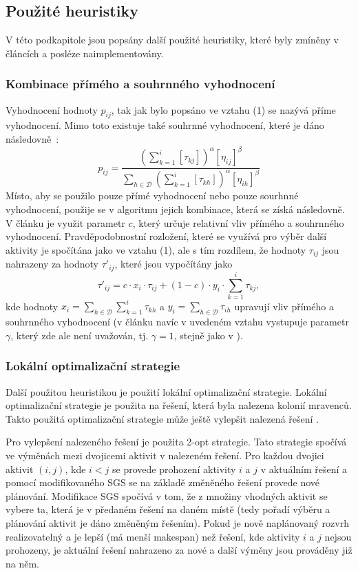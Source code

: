 \documentclass[a4paper,12pt]{article}
\begin{document}
\subsection{Použité heuristiky}
V této podkapitole jsou popsány další použité heuristiky, které byly zmíněny v článcích \cite{Merkle00antcolony, 1027745} a posléze naimplementovány.

\subsubsection{Kombinace přímého a souhrnného vyhodnocení}
Vyhodnocení hodnoty $p_{ij}$, tak jak bylo popsáno ve vztahu (1) se nazývá příme vyhodnocení. Mimo toto existuje
také souhrnné vyhodnocení, které je dáno následovně~\cite{Merkle00antcolony}:
\begin{equation}
  p_{ij} = \frac{(\sum_{k=1}^i[\tau_{kj}])^\alpha[\eta_{ij}]^\beta}{\sum_{h\in\mathcal{D}}(\sum_{k=1}^i[\tau_{kh}])^\alpha[\eta_{ih}]^\beta}
\end{equation}
Místo, aby se použilo pouze přímé vyhodnocení nebo pouze sourhnné vyhodnocení, použije se v algoritmu 
jejich kombinace, která se získá následovně. V článku je využit parametr $c$, který určuje relativní
vliv přímého a souhrnného vyhodnocení. Pravděpodobnostní rozložení, které se využívá pro výběr další
aktivity je spočítána jako ve vztahu (1), ale s tím rozdílem, že hodnoty $\tau_{ij}$ jsou nahrazeny
za hodnoty $\tau'_{ij}$, které jsou vypočítány jako \cite{Merkle00antcolony}
$$
  \tau'_{ij} = c\cdot x_i\cdot\tau_{ij} + (1-c)\cdot y_i\cdot\sum_{k = 1}^i\tau_{kj},
$$
kde hodnoty $x_i = \sum_{h\in\mathcal{D}}\sum_{k = 1}^i\tau_{kh}$ a $y_i = \sum_{h\in\mathcal{D}}\tau_{ih}$
upravují vliv přímého a souhrnného vyhodnocení (v článku \cite{1027745} navíc v uvedeném vztahu vystupuje
parametr $\gamma$, který zde ale není uvažován, tj. $\gamma = 1$, stejně jako v \cite{Merkle00antcolony}).

\subsubsection{Lokální optimalizační strategie}
Další použitou heuristikou je použití lokální optimalizační strategie. Lokální optimalizační strategie
je použita na řešení, která byla nalezena kolonií mravenců. Takto použitá optimalizační strategie
může ještě vylepšit nalezená řešení \cite{Merkle00antcolony, 1027745}.

Pro vylepšení nalezeného řešení je použita 2-opt strategie. Tato strategie spočívá ve výměnách
mezi dvojicemi aktivit v nalezeném řešení. Pro každou dvojici aktivit $(i,j)$, kde $i < j$ se
provede prohození aktivity $i$ a $j$ v aktuálním řešení a pomocí modifikovaného SGS se na základě změněného 
řešení provede nové plánování. 
Modifikace SGS spočívá v tom, že z množiny vhodných aktivit se vybere ta, která je v předaném řešení 
na daném místě (tedy pořadí výběru a plánování aktivit je dáno změněným řešením).
Pokud
je nově naplánovaný rozvrh realizovatelný a je lepší (má menší makespan) než řešení, kde 
aktivity $i$ a $j$ nejsou prohozeny, je aktuální řešení nahrazeno za nové a další výměny jsou
prováděny již na něm.
\end{document}
